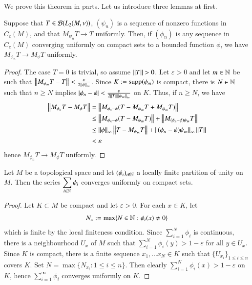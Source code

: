 \documentclass[leqno]{amsart}
\begin{document}
	We prove this theorem in parts. Let us introduce three lemmas at first.
	\begin{lemma}\label{convergy1}
		Suppose that $T\in {\mathcal B}(L_2(M,\nu))$, $(\psi_n)$ is a sequence of nonzero functions in $C_{c}(M)$, and that $M_{\psi_n}T\to T$ uniformly. Then, if $(\phi_n)$ is any sequence in $C_{c}(M)$ converging uniformly on compact sets to a bounded function $\phi$, we have $M_{\phi_n}T\to M_\phi T$ uniformly.
	\end{lemma}
	\begin{proof}
		The case $T=0$ is trivial, so assume $\left\lVert T\right\rVert>0$. Let $\varepsilon>0$ and let $m\in\mathbb{N}$ be such that $\left\lVert M_{\psi_m}T-T\right\rVert<\frac{\varepsilon}{2\left\lVert\phi\right\rVert_\infty}$. Since $K:={\rm supp}(\phi_m)$ is compact, there is $N\in\mathbb{N}$ such that $n\geq N$ implies $|\phi_n-\phi|<\frac{\varepsilon}{2\left\lVert T\right\rVert\left\lVert\psi_m\right\rVert_\infty}$ on $K$. Thus, if $n\geq N$, we have
		\begin{align*}
			\left\lVert M_{\phi_n}T-M_{\phi}T\right\rVert&=\left\lVert M_{\phi_n-\phi}(T-M_{\psi_m}T+M_{\psi_m}T)\right\rVert\\
			&\leq \left\lVert M_{\phi_n-\phi}(T-M_{\psi_m}T)\right\rVert+\left\lVert M_{(\phi_n-\phi)\psi_m}T\right\rVert\\
			&\leq \left\lVert\phi\right\rVert_\infty\left\lVert T-M_{\psi_m}T\right\rVert+\left\lVert(\phi_n-\phi)\psi_m\right\rVert_\infty\left\lVert T\right\rVert\\
			&<\varepsilon
		\end{align*}
		hence $M_{\phi_n}T\to M_\phi T$ uniformly.
	\end{proof}
	
	\begin{lemma}\label{convergy2}
		Let $M$ be a topological space and let $(\phi_i)_{i\in\mathbb{N}}$ a locally finite partition of unity on $M$. Then the series $\displaystyle\sum_{i\in\mathbb{N}} \phi_i$ converges uniformly on compact sets.
	\end{lemma}
	\begin{proof}
		Let $K\subset M$ be compact and let $\varepsilon>0$. For each $x\in K$, let
		$$N_x:=\max\{N\in\mathbb{N} : \phi_i(x)\neq 0\}$$
		which is finite by the local finiteness condition. Since $\displaystyle\sum_{i=1}^N\phi_i$ is continuous, there is a neighbourhood $U_x$ of $M$ such that $\displaystyle\sum_{i=1}^N\phi_i(y)>1-\varepsilon$ for all $y\in U_x$. Since $K$ is compact, there is a finite sequence $x_1,\dotsc x_N\in K$ such that $\{U_{x_i}\}_{1\leq i\leq n}$ covers $K$. Set $N=\max\{N_{x_i}:1\leq i\leq n\}$. Then clearly $\displaystyle\sum_{i=1}^N\phi_i(x)>1-\varepsilon$ on $K$, hence $\displaystyle\sum_{i=1}^\infty\phi_i$ converges uniformly on $K$.
	\end{proof}
	
\end{document}
